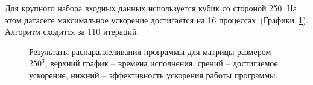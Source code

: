 \documentclass[12pt, oneside, a4paper]{article}
\begin{document}
Для крупного набора входных данных используется кубик со стороной 250. На этом датасете максимальное ускорение достигается на 16 процессах~(Графики~\ref{fig:m250}).
Алгоритм сходится за 110 итераций.

\begin{figure}[h!]
\caption{Результаты распараллеливания программы для матрицы размером $250^3$; верхний график -- времена исполнения, срений -- достигаемое ускорение, нижний -- эффективность ускорения работы программы.}
\label{fig:m250}
\end{figure}

\end{document}
